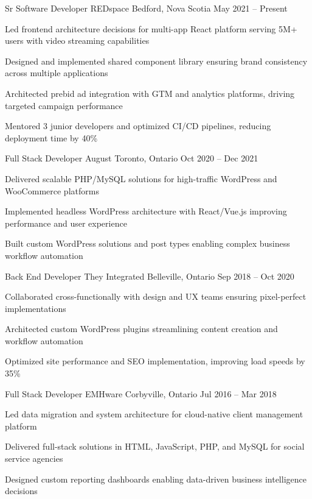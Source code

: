 
\begin{cventries}
  \cventry
    {Sr Software Developer}
    {REDspace}
    {Bedford, Nova Scotia}
    {May 2021 – Present}
    {
      \begin{cvitems}
          \item {Led frontend architecture decisions for multi-app React platform serving 5M+ users with video streaming capabilities}
          \item {Designed and implemented shared component library ensuring brand consistency across multiple applications}
          \item {Architected prebid ad integration with GTM and analytics platforms, driving targeted campaign performance}
          \item {Mentored 3 junior developers and optimized CI/CD pipelines, reducing deployment time by 40\%}
      \end{cvitems}
    }
    
  \cventry
    {Full Stack Developer}
    {August}
    {Toronto, Ontario}
    {Oct 2020 – Dec 2021}
    {
      \begin{cvitems}
        \item {Delivered scalable PHP/MySQL solutions for high-traffic WordPress and WooCommerce platforms}
        \item {Implemented headless WordPress architecture with React/Vue.js improving performance and user experience}
        \item {Built custom WordPress solutions and post types enabling complex business workflow automation}
      \end{cvitems}
    }
 
  \cventry
    {Back End Developer}
    {They Integrated}
    {Belleville, Ontario}
    {Sep 2018 – Oct 2020}
    {
      \begin{cvitems}
        \item {Collaborated cross-functionally with design and UX teams ensuring pixel-perfect implementations}
        \item {Architected custom WordPress plugins streamlining content creation and workflow automation}
        \item {Optimized site performance and SEO implementation, improving load speeds by 35\%}
      \end{cvitems}
    }
  
  \cventry
    {Full Stack Developer}
    {EMHware}
    {Corbyville, Ontario}
    {Jul 2016 – Mar 2018}
    {
      \begin{cvitems}
        \item {Led data migration and system architecture for cloud-native client management platform}
        \item {Delivered full-stack solutions in HTML, JavaScript, PHP, and MySQL for social service agencies}
        \item {Designed custom reporting dashboards enabling data-driven business intelligence decisions}
      \end{cvitems}
    }

\end{cventries}
